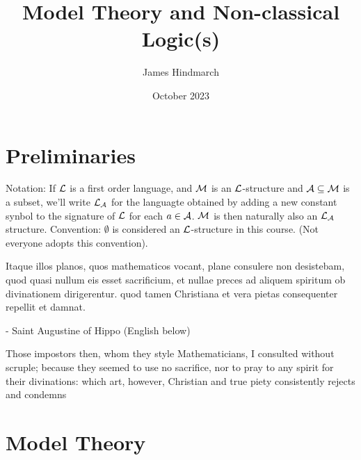 \documentclass{article}
\title{Model Theory and Non-classical Logic(s)}
\author{James Hindmarch}
\date{October 2023}
\numberwithin{thm}{subsection}
\begin{document}
\maketitle
\tableofcontents
\newpage
\newlec
\section{Preliminaries}
Notation: If $\mathcal{L}$ is a first order language, and $\mathcal{M}$ is an $\mathcal{L}$-structure and $\mathcal{A} \subseteq \mathcal{M}$ is a subset, we'll write $\mathcal{L}_{\mathcal{A}}$ for the languagte obtained by adding a new constant synbol to the signature of $\mathcal{L}$ for each $a \in \mathcal{A}$. $\mathcal{M}$ is then naturally also an $\mathcal{L}_{\mathcal{A}}$ structure. \gap 
Convention: $\emptyset$ is considered an $\mathcal{L}$-structure in this course. (Not everyone adopts this convention).
\begin{displayquote}
    Itaque illos planos, quos mathematicos vocant, plane consulere non desistebam, quod quasi nullum eis esset sacrificium, et nullae preces ad aliquem spiritum ob divinationem dirigerentur. quod tamen Christiana et vera pietas consequenter repellit et damnat.
\end{displayquote}
- Saint Augustine of Hippo (English below)
\begin{displayquote}
    Those impostors then, whom they style Mathematicians, I consulted without scruple; because they seemed to use no sacrifice, nor to pray to any spirit for their divinations: which art, however, Christian and true piety consistently rejects and condemns
\end{displayquote}
\section{Model Theory}
\end{document}
